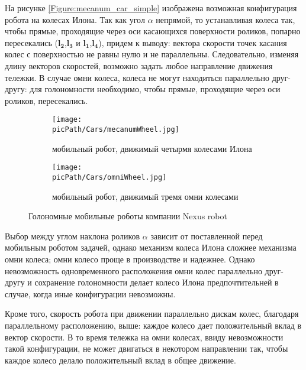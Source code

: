 \documentclass[oneside,final,14pt]{extreport}
\newcommand{\picPath}{img}
\newcommand{\bs}{\boldsymbol}
\begin{document}
На рисунке \ref{Figure:mecanum_car_simple} изображена возможная конфигурация робота на колесах Илона. Так как угол $\alpha$ непрямой, то устанавливая колеса так, чтобы прямые, проходящие через оси касающихся поверхности роликов, попарно пересекались ($\bs{l_{2}}$,$\bs{l_{3}}$ и $\bs{l_{1}}$,$\bs{l_{4}}$), придем к выводу: вектора скорости точек касания колес с поверхностью не равны нулю и не параллельны. Следовательно, изменяя длину векторов скоростей, возможно задать любое направление движения тележки. В случае омни колеса, колеса не могут находиться параллельно друг-другу: для голономности необходимо, чтобы прямые, проходящие через оси роликов, пересекались. 

\begin{figure}[H]
\end{figure}

\begin{figure}[H]
  \centering
  \begin{subfigure}[b]{0.4\linewidth}
   \texttt{[image: \\picPath/Cars/mecanumWheel.jpg]}
    \caption{ мобильный робот, движимый четырмя колесами Илона }
  \end{subfigure}
  \begin{subfigure}[b]{0.4\linewidth}
    \texttt{[image: \\picPath/Cars/omniWheel.jpg]}
    \caption{ мобильный робот, движимый тремя омни колесами }
  \end{subfigure}
  \caption{ Голономные мобильные роботы компании Nexus robot}
  \label{Figure:holonomicRobots}
\end{figure}
Выбор между углом наклона роликов $\alpha$ зависит от поставленной перед мобильным роботом задачей, однако механизм колеса Илона сложнее механизма омни колеса; омни колесо проще в производстве и надежнее. Однако невозможность одновременного расположения омни колес параллельно друг-другу и сохранение голономности делает колесо Илона предпочтительней в случае, когда иные конфигурации невозможны.  

Кроме того, скорость робота при движении параллельно дискам колес, благодаря параллельному расположению, выше: каждое колесо дает положительный вклад в вектор скорости. В то время тележка на омни колесах, ввиду невозможности такой конфигурации, не может двигаться в некотором направлении так, чтобы каждое колесо делало положительный вклад в общее движение.   
\end{document}
